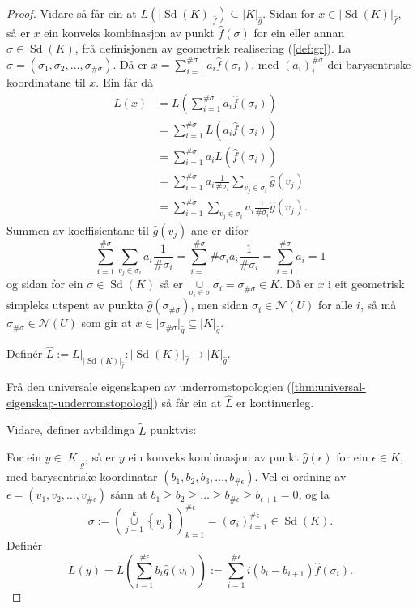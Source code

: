 \documentclass[a4paper, 12pt, norsk]{article}
\theoremstyle{plain}
\theoremstyle{definition}
\newcommand{\Nc}{\mathcal{N}}
\newcommand{\union}{ \mathop{\cup}\limits }
\newcommand{\gr}[1]{ \lvert #1 \rvert } %
\newcommand{\set}[1]{ \left\{ #1 \right\} } %
\newcommand{\tuple}[1]{ \left( #1 \right) } %
\DeclareMathOperator{\Sd}{Sd} %
\begin{document}
\begin{proof}
	Vidare så får ein at \( L(\gr{\Sd(K)}_{\hat{f}}) \subseteq \gr{K}_{\hat{g}} \). Sidan for \( x \in \gr{\Sd(K)}_{\hat{f}} \), så er \( x \) ein konveks kombinasjon av punkt \( \hat{f}(\sigma) \) for ein eller annan \( \sigma \in \Sd(K) \), frå definisjonen av geometrisk realisering (\autoref{def:gr}). La \( \sigma = (\sigma_1, \sigma_2, \dots, \sigma_{\#\sigma}) \). Då er \( x = \sum_{i=1}^{\#\sigma} a_i \hat{f}(\sigma_i) \), med \( (a_i)_i^{\#\sigma} \) dei barysentriske koordinatane til \( x \). Ein får då
	\begin{align*}
		L(x) &= L\left(\sum_{i=1}^{\#\sigma} a_i \hat{f}(\sigma_i)\right) \\
		&= \sum_{i=1}^{\#\sigma} L(a_i \hat{f}(\sigma_i)) \\
		&= \sum_{i=1}^{\#\sigma} a_i L(\hat{f}(\sigma_i)) \\
		&= \sum_{i=1}^{\#\sigma} a_i \frac{1}{\#\sigma_i} \sum_{v_j \in \sigma_i} \hat{g}(v_j) \\
		&= \sum_{i=1}^{\#\sigma} \sum_{v_j \in \sigma_i} a_i \frac{1}{\#\sigma_i} \hat{g}(v_j).
	\end{align*}
	Summen av koeffisientane til \( \hat{g}(v_j) \)-ane er difor
	\[
		\sum_{i=1}^{\#\sigma} \sum_{v_j \in \sigma_i} a_i \frac{1}{\#\sigma_i} = 
		\sum_{i=1}^{\#\sigma} \#\sigma_i a_i \frac{1}{\#\sigma_i} =
		\sum_{i=1}^{\#\sigma} a_i = 1
	\]
	og sidan for ein \( \sigma \in \Sd(K) \) så er \( \union_{\sigma_i \in \sigma} \sigma_i = \sigma_{\#\sigma} \in K \). Då er \( x \) i eit geometrisk simpleks utspent av punkta \( \hat{g}(\sigma_{\#\sigma}) \), men sidan \( \sigma_i \in \Nc(U) \) for alle \( i \), så må \( \sigma_{\#\sigma} \in \Nc(U) \) som gir at \( x \in \gr{\sigma_{\#\sigma}}_{\hat{g}} \subseteq \gr{K}_{\hat{g}} \).

	Definér \( \hat{L} := L|_{\gr{\Sd(K)}_{\hat{f}}}: \gr{\Sd(K)}_{\hat{f}} \to \gr{K}_{\hat{g}} \).

	Frå den universale eigenskapen av underromstopologien (\autoref{thm:universal-eigenskap-underromstopologi}) så får ein at \( \hat{L} \) er kontinuerleg.

	Vidare, definer avbildinga \( \tilde{L} \) punktvis:
	
	For ein \( y \in \gr{K}_{\hat{g}} \), så er \( y \) ein konveks kombinasjon av punkt \( \hat{g}(\epsilon) \) for ein \( \epsilon \in K \), med barysentriske koordinatar \( \tuple{b_1, b_2, b_3, \dots, b_{\#\epsilon}} \). Vel ei ordning av \( \epsilon = \tuple{v_1, v_2, \dots, v_{\#\epsilon}} \) sånn at \( b_1 \geq b_2 \geq \dots \geq b_{\#\epsilon} \geq  b_{\epsilon+1}=0 \), og la
	\[
		\sigma := \tuple{\union_{j=1}^k\set{v_j}}_{k=1}^{\#\epsilon} = \tuple{\sigma_i}_{i=1}^{\#\epsilon} \in \Sd(K).
	\]
	Definér
	\[
		\tilde{L}(y) = \tilde{L}\tuple{\sum_{i=1}^{\#\epsilon} b_i \hat{g}(v_i)} := \sum_{i=1}^{\#\epsilon}i\tuple{b_i-b_{i+1}}\hat{f}(\sigma_i).
	\]


\end{proof}
\end{document}
